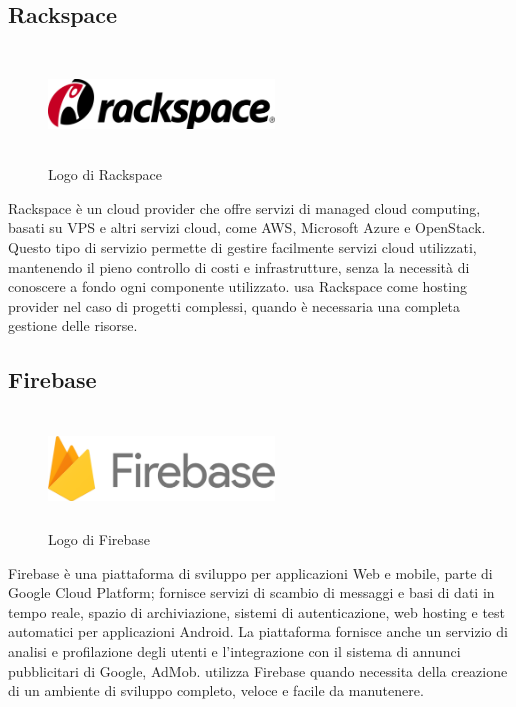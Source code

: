    \subsection{Rackspace}
   \begin{figure}[H]
      \begin{center}
         \includegraphics[width=6cm,height=3cm,keepaspectratio]{immagini/rackspace-logo}
      \end{center}
      \caption{Logo di Rackspace}\label{logorackspace}
   \end{figure}
   Rackspace è un cloud provider che offre servizi di managed cloud computing, basati su \gls{VPS} e altri servizi cloud, come \gls{AWS}, Microsoft Azure e OpenStack. Questo tipo di servizio permette di gestire facilmente servizi cloud utilizzati, mantenendo il pieno controllo di costi e infrastrutture, senza la necessità di conoscere a fondo ogni componente utilizzato. 
   \nomeAzienda{} usa Rackspace come hosting provider nel caso di progetti complessi, quando è necessaria una completa gestione delle risorse.

   \subsection{Firebase}
   \begin{figure}[H]
      \begin{center}
         \includegraphics[width=6cm,height=3cm,keepaspectratio]{immagini/firebase-logo}
      \end{center}
      \caption{Logo di Firebase}\label{logofirebase}
   \end{figure}
   Firebase è una piattaforma di sviluppo per applicazioni Web e mobile, parte di Google Cloud Platform; fornisce servizi di scambio di messaggi e basi di dati in tempo reale, spazio di archiviazione, sistemi di autenticazione, web hosting e test automatici per applicazioni Android. La piattaforma fornisce anche un servizio di analisi e profilazione degli utenti e l'integrazione con il sistema di annunci pubblicitari di Google, AdMob.
   \nomeAzienda{} utilizza Firebase quando necessita della creazione di un ambiente di sviluppo completo, veloce e facile da manutenere.

